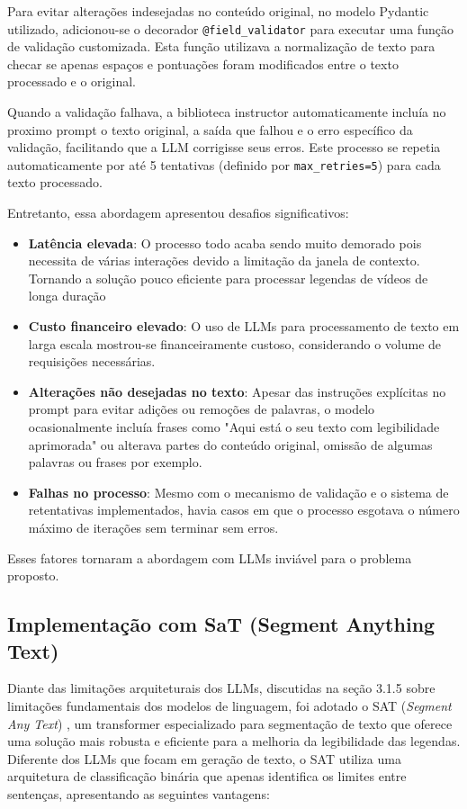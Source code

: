 \documentclass[tcc,capa]{texufpel}
\begin{document}
Para evitar alterações indesejadas no conteúdo original, no modelo Pydantic utilizado, adicionou-se o decorador \verb|@field_validator| para executar
uma função de validação customizada. Esta função utilizava a normalização
de texto para checar se apenas espaços e pontuações foram modificados
entre o texto processado e o original. 

Quando a validação falhava, a
biblioteca instructor automaticamente incluía no proximo prompt o texto
original, a saída que falhou e o erro específico da validação, facilitando que a LLM corrigisse seus erros. Este processo
se repetia automaticamente por até 5 tentativas (definido por
\verb|max_retries=5|) para cada texto processado.

Entretanto, essa abordagem apresentou desafios significativos:
\begin{itemize}
  \item \textbf{Latência elevada}: O processo todo acaba sendo muito demorado pois necessita de várias interações devido a limitação da janela de contexto. Tornando a solução pouco eficiente para processar legendas de vídeos de longa duração
  \item \textbf{Custo financeiro elevado}: O uso de LLMs para processamento de texto em larga escala mostrou-se financeiramente custoso, considerando o volume de requisições necessárias.
  \item \textbf{Alterações não desejadas no texto}: Apesar das instruções explícitas no prompt para evitar adições ou remoções de palavras, o modelo ocasionalmente incluía frases como "Aqui está o seu texto com legibilidade aprimorada" ou alterava partes do conteúdo original, omissão de algumas palavras ou frases por exemplo.
  \item \textbf{Falhas no processo}: Mesmo com o mecanismo de validação e o sistema de retentativas implementados, havia casos em que o processo esgotava o número máximo de iterações sem terminar sem erros.
\end{itemize}

Esses fatores tornaram a abordagem com LLMs inviável para o problema proposto.

\subsection{Implementação com SaT (Segment Anything Text)}

Diante das limitações arquiteturais dos LLMs, discutidas na seção 3.1.5 sobre limitações fundamentais dos modelos de linguagem, foi adotado o SAT (\textit{Segment Any Text}) \cite{frohmann2024segment}, um transformer especializado para segmentação de texto que oferece uma solução mais robusta e eficiente para a melhoria da legibilidade das legendas. Diferente dos LLMs que focam em geração de texto, o SAT utiliza uma arquitetura de classificação binária que apenas identifica os limites entre sentenças, apresentando as seguintes vantagens:
\end{document}
